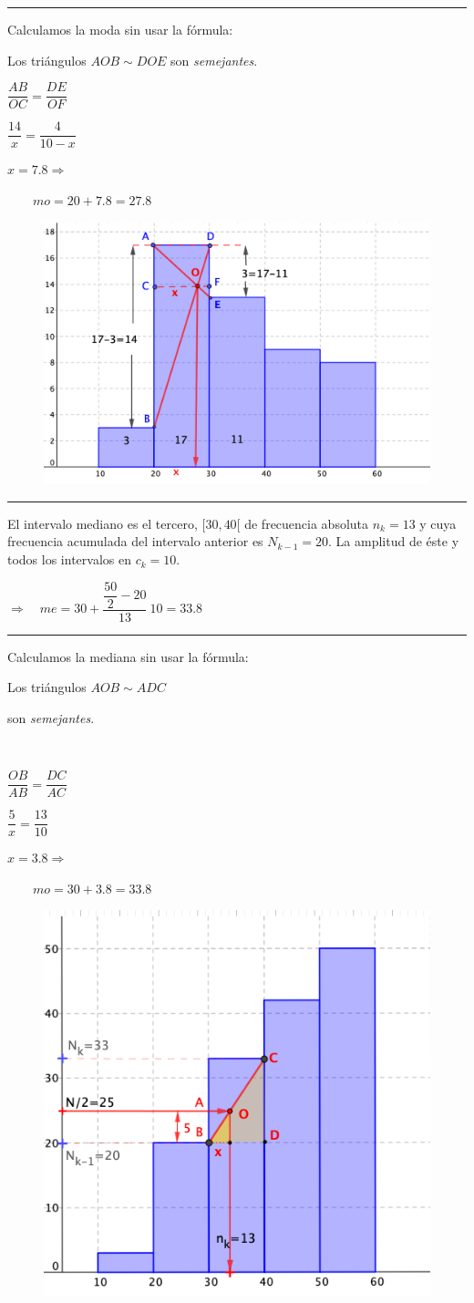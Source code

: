 \vspace{5mm} %
{\color{gris}\hrule} 
\begin{multicols}{2}
Calculamos la moda sin usar la fórmula:

Los triángulos $AOB \sim DOE$ son \emph{semejantes}.

$\dfrac{AB}{OC}=\dfrac{DE}{OF}$

$\dfrac{14}{x}=\dfrac{4}{10-x}$

$x=7.8 \Rightarrow $



$\qquad mo=20+7.8=27.8$

\begin{figure}[H]
			\centering
			\includegraphics[width=.5\textwidth]{imagenes/imagenes01/T01IM23.png}
	\end{figure}
\end{multicols}
{\color{gris}\hrule}

\vspace{5mm} %
El intervalo mediano es el tercero, $[30,40[$ de frecuencia absoluta $n_k=13$ y cuya frecuencia acumulada del intervalo anterior es $N_{k-1}=20$. La amplitud de éste y todos los intervalos en $c_k=10$.

$\Rightarrow \quad  me=30+\dfrac{\dfrac{50}{2}-20}{13}\ 10=33.8$


\vspace{10mm}
{\color{gris}\hrule}
\begin{multicols}{2}
Calculamos la mediana sin usar la fórmula:

Los triángulos $AOB \sim ADC$ 

son \emph{semejantes}.

$\quad$

$\dfrac{OB}{AB}=\dfrac{DC}{AC}$

$\dfrac{5}{x}=\dfrac{13}{10}$

$x=3.8 \Rightarrow $

$\qquad  mo=30+3.8=33.8$

\begin{figure}[H]
			\centering
			\includegraphics[width=.4\textwidth]{imagenes/imagenes01/T01IM24.png}
	\end{figure}
\end{multicols}

